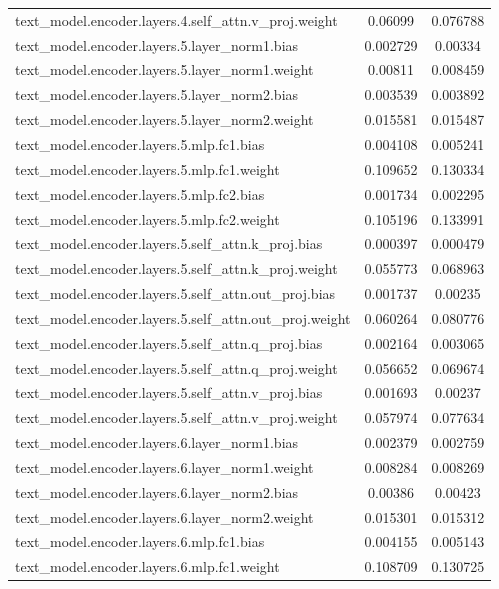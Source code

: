 \begin{longtable}{lcc}
text\_model.encoder.layers.4.self\_attn.v\_proj.weight & 0.06099 & 0.076788 \\
text\_model.encoder.layers.5.layer\_norm1.bias & 0.002729 & 0.00334 \\
text\_model.encoder.layers.5.layer\_norm1.weight & 0.00811 & 0.008459 \\
text\_model.encoder.layers.5.layer\_norm2.bias & 0.003539 & 0.003892 \\
text\_model.encoder.layers.5.layer\_norm2.weight & 0.015581 & 0.015487 \\
text\_model.encoder.layers.5.mlp.fc1.bias & 0.004108 & 0.005241 \\
text\_model.encoder.layers.5.mlp.fc1.weight & 0.109652 & 0.130334 \\
text\_model.encoder.layers.5.mlp.fc2.bias & 0.001734 & 0.002295 \\
text\_model.encoder.layers.5.mlp.fc2.weight & 0.105196 & 0.133991 \\
text\_model.encoder.layers.5.self\_attn.k\_proj.bias & 0.000397 & 0.000479 \\
text\_model.encoder.layers.5.self\_attn.k\_proj.weight & 0.055773 & 0.068963 \\
text\_model.encoder.layers.5.self\_attn.out\_proj.bias & 0.001737 & 0.00235 \\
text\_model.encoder.layers.5.self\_attn.out\_proj.weight & 0.060264 & 0.080776 \\
text\_model.encoder.layers.5.self\_attn.q\_proj.bias & 0.002164 & 0.003065 \\
text\_model.encoder.layers.5.self\_attn.q\_proj.weight & 0.056652 & 0.069674 \\
text\_model.encoder.layers.5.self\_attn.v\_proj.bias & 0.001693 & 0.00237 \\
text\_model.encoder.layers.5.self\_attn.v\_proj.weight & 0.057974 & 0.077634 \\
text\_model.encoder.layers.6.layer\_norm1.bias & 0.002379 & 0.002759 \\
text\_model.encoder.layers.6.layer\_norm1.weight & 0.008284 & 0.008269 \\
text\_model.encoder.layers.6.layer\_norm2.bias & 0.00386 & 0.00423 \\
text\_model.encoder.layers.6.layer\_norm2.weight & 0.015301 & 0.015312 \\
text\_model.encoder.layers.6.mlp.fc1.bias & 0.004155 & 0.005143 \\
text\_model.encoder.layers.6.mlp.fc1.weight & 0.108709 & 0.130725 \\

\end{longtable}
